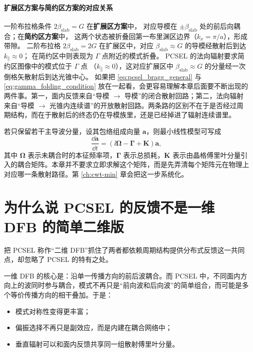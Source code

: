 \paragraph{扩展区方案与简约区方案的对应关系}
一阶布拉格条件 $2\beta_{\mathrm{slab}} = G$ 在\textbf{扩展区方案}中，
对应导模在 $\pm\beta_{\mathrm{slab}}$ 处的前后向耦合；在\textbf{简约区方案}中，
这两个状态被折叠回第一布里渊区边界（$k_x = \pi/a$），形成带隙。
二阶布拉格 $2\beta_{\mathrm{slab}} = 2G$ 在扩展区中，对应
$\beta_{\mathrm{slab}} \approx G$ 的导模经散射后到达 $k_\parallel \approx 0$；
在简约区中则表现为 $\Gamma$ 点附近的模式折叠。
PCSEL 的法向辐射要求简约区图像中的模式位于 $\Gamma$ 点
（$k_\parallel \approx 0$），这对应扩展区中 $\beta_{\mathrm{slab}} \approx G$
的分量经一次倒格矢散射后到达光锥中心。
如果把 \cref{eq:pcsel_bragg_general} 与 \cref{eq:gamma_folding_condition} 放在一起看，会更容易理解本章后面要不断出现的两件事。第一，面内反馈来自“导模 $\rightarrow$ 导模”的闭合散射回路；第二，法向辐射来自“导模 $\rightarrow$ 光锥内连续谱”的开放散射回路。两条路的区别不在于是否经过周期结构，而在于散射后的终态仍在导模族里，还是已经掉进了辐射连续谱里。

\begin{RigorousBox}
若只保留若干主导波分量，设其包络组成向量 $\bm{a}$，则最小线性模型可写成
\[
\frac{\dd \bm{a}}{\dd t}=\left(\ii\bm{\Omega}-\bm{\Gamma}+\mathbf{K}\right)\bm{a},
\]
其中 $\bm{\Omega}$ 表示未耦合时的本征频率项，$\bm{\Gamma}$ 表示总损耗，$\mathbf{K}$ 表示由晶格傅里叶分量引入的耦合矩阵。本章并不要求立即求解这个矩阵，而是先弄清每个矩阵元在物理上对应哪一条散射路径。第 \ref{ch:cwt-min} 章会把这一步系统化。
\end{RigorousBox}

\section{为什么说 PCSEL 的反馈不是一维 DFB 的简单二维版}
把 PCSEL 称作“二维 DFB”抓住了两者都依赖周期结构提供分布式反馈这一共同点，却忽略了 PCSEL 的特有之处。

一维 DFB 的核心是：沿单一传播方向的前后波耦合。而 PCSEL 中，不同面内方向上的波同时参与耦合，模式不再只是“前向波和后向波”的简单组合，而可能是多个等价传播方向的相干叠加。于是：
\begin{itemize}
  \item 模式对称性变得更丰富；
  \item 偏振选择不再只是副效应，而是内建在耦合网络中；
  \item 垂直辐射可以和面内反馈共享同一组散射傅里叶分量。
\end{itemize}

